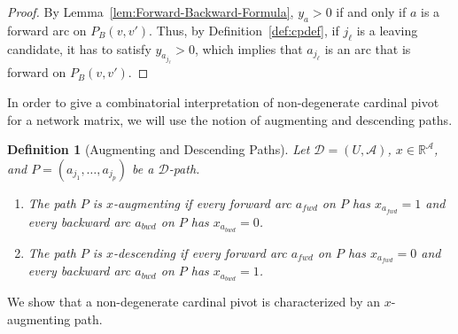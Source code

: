 \documentclass[11pt]{article}
\newtheorem{definition}[theorem]{Definition}
\begin{document}
\begin{proof}
By Lemma~\ref{lem:Forward-Backward-Formula}, $y_a>0$ if and only if $a$ is a forward arc on $P_B(v,v')$. Thus, by Definition~\ref{def:cpdef}, if $j_\ell$ is a leaving candidate, it has to satisfy $y_{a_{j_\ell}}>0$, which implies that $a_{j_\ell}$ is an arc that is forward on $P_B(v,v')$.
\end{proof}

In order to give a combinatorial interpretation of non-degenerate cardinal pivot for a network matrix, we will use the notion of augmenting and descending paths. 


\begin{definition}[Augmenting and Descending Paths]\label{def:x-alternating}
    Let $\mathcal{D}=(U,\mathcal{A})$, $x\in\mathbb{R}^\mathcal{A}$, and $P=(a_{j_1},\dots,a_{j_p})$ be a $\mathcal{D}$-path. 
    \begin{enumerate}
        \item The path $P$ is \emph{$x$-augmenting} if every forward arc $a_{fwd}$ on $P$ has $x_{a_{fwd}}=1$ and every backward arc $a_{bwd}$ on $P$ has $x_{a_{bwd}}=0$.
        \item The path $P$ is \emph{$x$-descending} if every forward arc $a_{fwd}$ on $P$ has $x_{a_{fwd}}=0$ and every backward arc $a_{bwd}$ on $P$ has $x_{a_{bwd}}=1$.
    \end{enumerate}
    
\end{definition}
We show that a non-degenerate cardinal pivot is characterized by an $x$-augmenting path.
\end{document}

